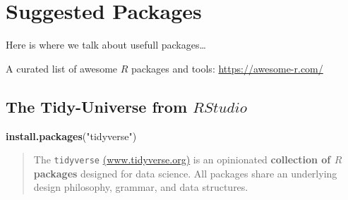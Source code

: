 \documentclass[]{book}
\newenvironment{Shaded}{\begin{snugshade}}{\end{snugshade}}
\newcommand{\KeywordTok}[1]{\textcolor[rgb]{0.13,0.29,0.53}{\textbf{#1}}}
\newcommand{\DataTypeTok}[1]{\textcolor[rgb]{0.13,0.29,0.53}{#1}}
\newcommand{\DecValTok}[1]{\textcolor[rgb]{0.00,0.00,0.81}{#1}}
\newcommand{\StringTok}[1]{\textcolor[rgb]{0.31,0.60,0.02}{#1}}
\newcommand{\CommentTok}[1]{\textcolor[rgb]{0.56,0.35,0.01}{\textit{#1}}}
\newcommand{\OtherTok}[1]{\textcolor[rgb]{0.56,0.35,0.01}{#1}}
\newcommand{\OperatorTok}[1]{\textcolor[rgb]{0.81,0.36,0.00}{\textbf{#1}}}
\newcommand{\NormalTok}[1]{#1}
\theoremstyle{definition}
\theoremstyle{definition}
\theoremstyle{definition}
\theoremstyle{remark}
\begin{document}
\chapter{Suggested Packages}\label{suggested-packages}

\begin{Shaded}
\end{Shaded}

Here is where we talk about usefull packages\ldots{}

A curated list of awesome \(R\) packages and tools:
\url{https://awesome-r.com/}

\section{\texorpdfstring{The Tidy-Universe from
\(R Studio\)}{The Tidy-Universe from R Studio}}\label{the-tidy-universe-from-r-studio}

\begin{Shaded}
\begin{Highlighting}[]
\KeywordTok{install.packages}\NormalTok{(}\StringTok{"tidyverse"}\NormalTok{)}
\end{Highlighting}
\end{Shaded}

\begin{quote}
The \texttt{tidyverse}
\href{https://www.tidyverse.org/}{(www.tidyverse.org)} is an opinionated
\textbf{collection of \(R\) packages} designed for data science. All
packages share an underlying design philosophy, grammar, and data
structures.
\end{quote}
\end{document}
